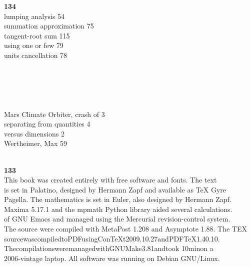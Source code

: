\documentclass[a4paper,fleqn]{article}
\begin{document}
\begin{multicols}{2}
\large{}\leftline\textbf{134}\\

lumping analysis 54\\
summation approximation 75 \\
tangent-root sum 115 \\
using one or few 79\\
units cancellation 78\\\\\\\\\\\\

Mars Climate Orbiter, crash of 3 \\
separating from quantities 4\\
versus dimensions 2\\
Wertheimer, Max 59\\\\
\end{multicols}

\newpage


\large{}\hfill\textbf{133}\\

This book was created entirely with free software and fonts. The text\\
is set in Palatino, designed by Hermann Zapf and available as TeX Gyre\\ 
Pagella. The mathematics is set in Euler, also designed by Hermann Zapf.\\ 
Maxima 5.17.1 and the mpmath Python library aided several calculations.\\ 
of GNU Emacs and managed using the Mercurial revision-control system. \\
The  source were compiled with MetaPost 1.208 and Asymptote 
1.88. The TEX \\
sourcewascompiledtoPDFusingConTeXt2009.10.27andPDFTeX1.40.10. \\
ThecompilationsweremanagedwithGNUMake3.81andtook 10minon a\\ 2006-vintage laptop. All software was running on Debian GNU/Linux. 
  
\end{document}
